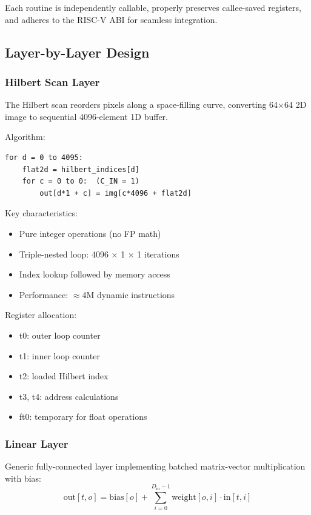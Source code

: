 \documentclass[conference]{IEEEtran}
\begin{document}
Each routine is independently callable, properly preserves callee-saved registers, and adheres to the RISC-V ABI for seamless integration.

\subsection{Layer-by-Layer Design}

\subsubsection{Hilbert Scan Layer}

The Hilbert scan reorders pixels along a space-filling curve, converting 64×64 2D image to sequential 4096-element 1D buffer.

Algorithm:
\begin{lstlisting}
for d = 0 to 4095:
    flat2d = hilbert_indices[d]
    for c = 0 to 0:  (C_IN = 1)
        out[d*1 + c] = img[c*4096 + flat2d]
\end{lstlisting}

Key characteristics:
\begin{itemize}
    \item Pure integer operations (no FP math)
    \item Triple-nested loop: 4096 × 1 × 1 iterations
    \item Index lookup followed by memory access
    \item Performance: $\approx$4M dynamic instructions
\end{itemize}

Register allocation:
\begin{itemize}
    \item t0: outer loop counter
    \item t1: inner loop counter
    \item t2: loaded Hilbert index
    \item t3, t4: address calculations
    \item ft0: temporary for float operations
\end{itemize}

\subsubsection{Linear Layer}

Generic fully-connected layer implementing batched matrix-vector multiplication with bias:
$$\text{out}[t,o] = \text{bias}[o] + \sum_{i=0}^{D_{\text{in}}-1} \text{weight}[o,i] \cdot \text{in}[t,i]$$
\end{document}
